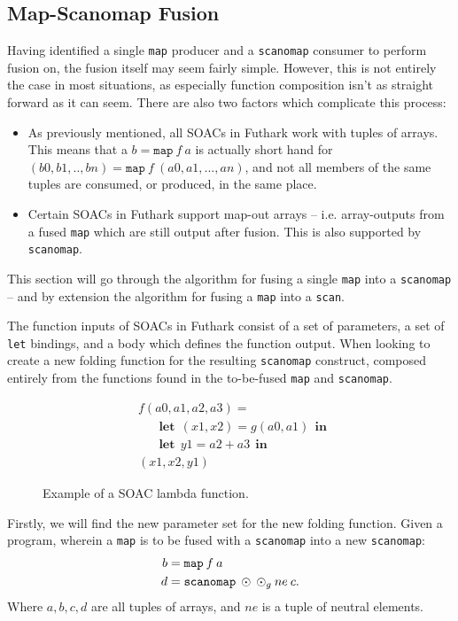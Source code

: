 \documentclass[11pt]{article}
\newcommand\lett{\phantom{-}\:\:\mathbf{let}\:\:}
\newcommand\inn{\:\:\mathbf{in}\:\:}
\begin{document}
\subsection{Map-Scanomap Fusion}
\setcounter{equation}{0}
Having identified a single \texttt{map} producer and a \texttt{scanomap} consumer to perform fusion on, the fusion itself may seem fairly simple.
 However, this is not entirely the case in most situations, as especially function composition isn't as straight forward as it can seem. There are also two factors
 which complicate this process:
 \begin{itemize}
 \item As previously mentioned, all SOACs in Futhark work with tuples of arrays. This means that a $b = \mathtt{map}\: f \: a$ is actually short hand for
$(b0, b1, .. ,bn) = \mathtt{map} \: f \: (a0, a1, ..., an)$, and not all members of the same tuples are consumed, or produced, in the same place.
 \item Certain SOACs in Futhark support map-out arrays -- i.e. array-outputs from a fused \texttt{map} which are still output after fusion. This is also
 supported by \texttt{scanomap}. 
 \end{itemize}
This section will go through the algorithm for fusing a single \texttt{map} into a \texttt{scanomap} -- and by extension the algorithm for fusing a \texttt{map} into a \texttt{scan}.

The function inputs of SOACs in Futhark consist of a set of parameters, a set of \texttt{let} bindings, and a body which defines the function output. When
 looking to create a new folding function for the resulting \texttt{scanomap} construct, composed entirely from the functions found in the to-be-fused \texttt{map} and \texttt{scanomap}.
\begin{figure}[h!]
  \centering
  \begin{align}
    &f (a0, a1, a2, a3) = \\
    &\lett (x1,x2) = g(a0, a1) \inn \\
    &\lett y1 = a2 + a3 \inn \\
    &(x1, x2, y1)
  \end{align}
  \caption{Example of a SOAC lambda function.}
\end{figure}
Firstly, we will find the new parameter set for the new folding function. Given a program, wherein a \texttt{map} is to be fused with a \texttt{scanomap} into a new \texttt{scanomap}:
\begin{align*}
b &= \mathtt{map} \: f \: a \\
d &= \mathtt{scanomap} \: \odot \: \odot_g \: ne \: c \mathnormal{.}  
\end{align*}
Where $a, b, c, d$ are all tuples of arrays, and $ne$ is a tuple of neutral elements.
\end{document}
